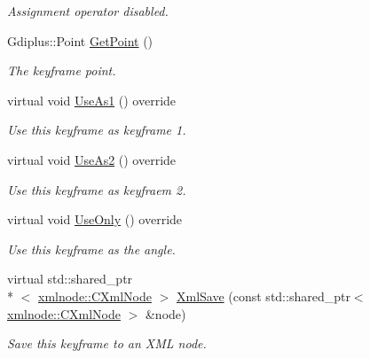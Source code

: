 \begin{DoxyCompactItemize}
\begin{DoxyCompactList}\small\item\em Assignment operator disabled. \end{DoxyCompactList}\item 
Gdiplus\+::\+Point \hyperlink{class_c_anim_channel_point_1_1_keyframe_point_a77739c3169abf796b3fb8b20b6cbf222}{Get\+Point} ()
\begin{DoxyCompactList}\small\item\em The keyframe point. \end{DoxyCompactList}\item 
\hypertarget{class_c_anim_channel_point_1_1_keyframe_point_a887efcb2e3fff4a542b73c534946ddad}{virtual void \hyperlink{class_c_anim_channel_point_1_1_keyframe_point_a887efcb2e3fff4a542b73c534946ddad}{Use\+As1} () override}\label{class_c_anim_channel_point_1_1_keyframe_point_a887efcb2e3fff4a542b73c534946ddad}

\begin{DoxyCompactList}\small\item\em Use this keyframe as keyframe 1. \end{DoxyCompactList}\item 
\hypertarget{class_c_anim_channel_point_1_1_keyframe_point_ad9a0581448750015cdaac39cc7382e52}{virtual void \hyperlink{class_c_anim_channel_point_1_1_keyframe_point_ad9a0581448750015cdaac39cc7382e52}{Use\+As2} () override}\label{class_c_anim_channel_point_1_1_keyframe_point_ad9a0581448750015cdaac39cc7382e52}

\begin{DoxyCompactList}\small\item\em Use this keyframe as keyfraem 2. \end{DoxyCompactList}\item 
\hypertarget{class_c_anim_channel_point_1_1_keyframe_point_ab9c9f2a63b36ff17f253c15b74fb818c}{virtual void \hyperlink{class_c_anim_channel_point_1_1_keyframe_point_ab9c9f2a63b36ff17f253c15b74fb818c}{Use\+Only} () override}\label{class_c_anim_channel_point_1_1_keyframe_point_ab9c9f2a63b36ff17f253c15b74fb818c}

\begin{DoxyCompactList}\small\item\em Use this keyframe as the angle. \end{DoxyCompactList}\item 
virtual std\+::shared\+\_\+ptr\\*
$<$ \hyperlink{classxmlnode_1_1_c_xml_node}{xmlnode\+::\+C\+Xml\+Node} $>$ \hyperlink{class_c_anim_channel_point_1_1_keyframe_point_a531900a8e7e5e9d579d92364ff469844}{Xml\+Save} (const std\+::shared\+\_\+ptr$<$ \hyperlink{classxmlnode_1_1_c_xml_node}{xmlnode\+::\+C\+Xml\+Node} $>$ \&node)
\begin{DoxyCompactList}\small\item\em Save this keyframe to an X\+M\+L node. \end{DoxyCompactList}\end{DoxyCompactItemize}
